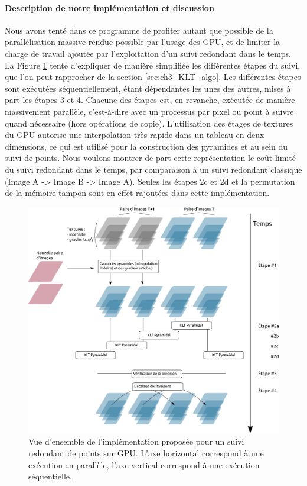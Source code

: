 \paragraph{Description de notre implémentation et discussion\\}
Nous avons tenté dans ce programme de profiter autant que possible de la parallélisation massive rendue possible par l'usage des GPU, et de limiter la charge de travail ajoutée par l'exploitation d'un suivi redondant dans le temps. La Figure \ref{fig:ch3_GPU_KLT} tente d'expliquer de manière simplifiée les différentes étapes du suivi, que l'on peut rapprocher de la section \ref{sec:ch3_KLT_algo}. Les différentes étapes sont exécutées séquentiellement, étant dépendantes les unes des autres, mises à part les étapes 3 et 4. Chacune des étapes est, en revanche, exécutée de manière massivement parallèle, c'est-à-dire avec un processus par pixel ou point à suivre quand nécessaire (hors opérations de copie). L'utilisation des étages de textures du GPU autorise une interpolation très rapide dans un tableau en deux dimensions, ce qui est utilisé pour la construction des pyramides et au sein du suivi de points. Nous voulons montrer de part cette représentation le coût limité du suivi redondant dans le temps, par comparaison à un suivi redondant classique (Image A -> Image B -> Image A). Seules les étapes 2c et 2d et la permutation de la mémoire tampon sont en effet rajoutées dans cette implémentation.

\begin{figure}
	\centerline {
		\includegraphics[width=1.3\textwidth]{Chapter3/graphics/4_Frames_implementation_diagram.png}
	}
	\caption{Vue d'ensemble de l'implémentation proposée pour un suivi redondant de points sur GPU. L'axe horizontal correspond à une exécution en parallèle, l'axe vertical correspond à une exécution séquentielle.}
	\label{fig:ch3_GPU_KLT}	
\end{figure}


